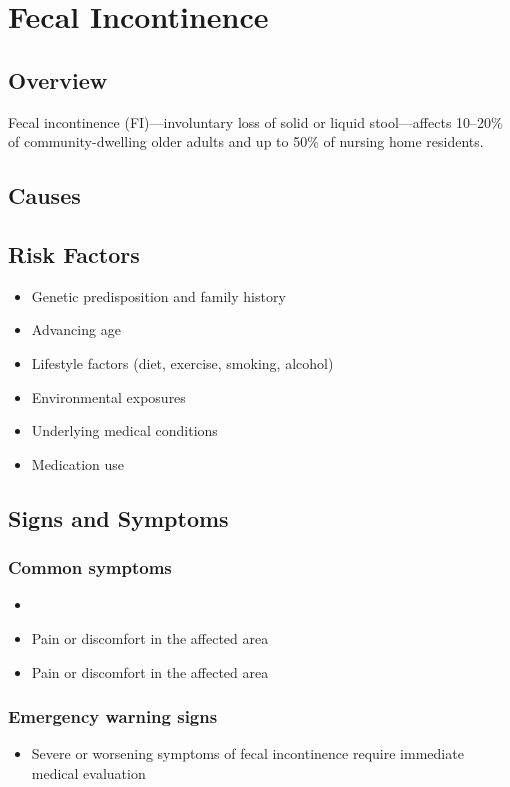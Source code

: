 \chapter{Fecal Incontinence}
\label{sec:Fecal Incontinence}

\section{Overview}
Fecal incontinence (FI)---involuntary loss of solid or liquid stool---affects 10--20\% of community-dwelling older adults and up to 50\% of nursing home residents.
\section{Causes}
\section{Risk Factors}

\begin{itemize}[noitemsep]
  \item Genetic predisposition and family history
  \item Advancing age
  \item Lifestyle factors (diet, exercise, smoking, alcohol)
  \item Environmental exposures
  \item Underlying medical conditions
  \item Medication use
\end{itemize}
\section{Signs and Symptoms}

\subsection{Common symptoms}
\begin{itemize}[noitemsep]
  \item \item Pain or discomfort in the affected area    \item Pain or discomfort in the affected area
  \end{itemize}

\subsection{Emergency warning signs}
\begin{itemize}[noitemsep]
  \item Severe or worsening symptoms of fecal incontinence require immediate medical evaluation
\end{itemize}
